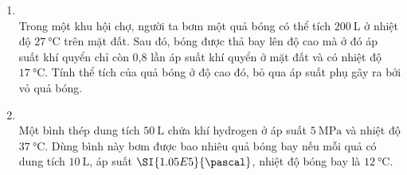 \begin{enumerate}[label=\bfseries Câu \arabic*:, leftmargin=1.7cm]
\item {}\\
Trong một khu hội chợ, người ta bơm một quả bóng có thể tích $\SI{200}{\liter}$ ở nhiệt độ $\SI{27}{\celsius}$ trên mặt đất. Sau đó, bóng được thả bay lên độ cao mà ở đó áp suất khí quyển chỉ còn 0,8 lần áp suất khí quyển ở mặt đất và có nhiệt độ $\SI{17}{\celsius}$. Tính thể tích của quả bóng ở độ cao đó, bỏ qua áp suất phụ gây ra bởi vỏ quả bóng.

\item {}\\
Một bình thép dung tích $\SI{50}{\liter}$ chứa khí hydrogen ở áp suất $\SI{5}{\mega\pascal}$ và nhiệt độ $\SI{37}{\celsius}$. Dùng bình này bơm được bao nhiêu quả bóng bay nếu mỗi quả có dung tích $\SI{10}{\liter}$, áp suất $\SI{1.05E5}{\pascal}$, nhiệt độ bóng bay là $\SI{12}{\celsius}$.


\end{enumerate}
